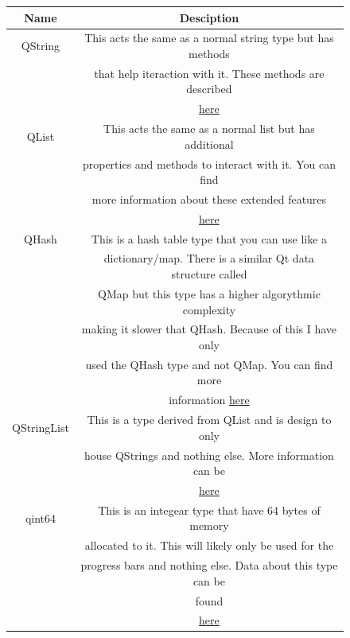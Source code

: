 \documentclass{article}
\begin{document}
\begin{figure}[H]
    \begin{center}
        \begin{tabular} {| c | c |}
            \hline
            \textbf{Name}        &         \textbf{Desciption}                               \\ \hline
            QString              &This acts the same as a normal string type but has methods \\
                                 &that help iteraction with it. These methods are described  \\
                                 &\href{https://doc.qt.io/qt-5/qstring.html}{here}           \\ \hline
            QList                &This acts the same as a normal list but has additional     \\
                                 &properties and methods to interact with it. You can find   \\
                                 &more information about these extended features             \\
                                 &\href{https://doc.qt.io/qt-5/qlist.html}{here}             \\ \hline
            QHash                &This is a hash table type that you can use like a          \\
                                 &dictionary/map. There is a similar Qt data structure called\\
                                 &QMap but this type has a higher algorythmic complexity     \\
                                 &making it slower that QHash. Because of this I have only   \\
                                 &used the QHash type and not QMap. You can find more        \\
                                 &information \href{https://doc.qt.io/qt-5/qhash.html}{here} \\ \hline
            QStringList          &This is a type derived from QList and is design to only    \\
                                 &house QStrings and nothing else. More information can be   \\
                                 &\href{http://doc.qt.io/qt-5/qstringlist.html}{here}        \\ \hline
            qint64               &This is an integear type that have 64 bytes of memory      \\
                                 &allocated to it. This will likely only be used for the     \\
                                 &progress bars and nothing else. Data about this type can be\\
                                 &found                                                      \\
                                 &\href{https://doc.qt.io/qt-5/qtglobal.html#qint64-typedef}{here} \\ \hline


\end{tabular}
\end{center}
\end{figure}
\end{document}
